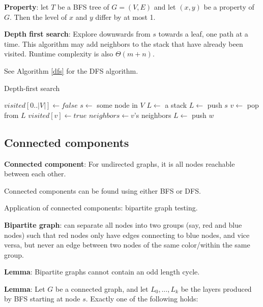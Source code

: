 \documentclass{article}
\begin{document}
\textbf{Property}: let $T$ be a BFS tree of $G = (V, E)$ and let $(x, y)$ be a property of $G$. Then the level of $x$ and $y$ differ by at most 1.

\textbf{Depth first search}: Explore downwards from $s$ towards a leaf, one path at a time. This algorithm may add neighbors to the stack that have already been visited. Runtime complexity is also $\Theta(m + n)$.

See Algorithm \ref{dfs} for the DFS algorithm.

\begin{algorithm}
\caption{Depth-first search}\label{dfs}
\begin{algorithmic}[1]
    \State $visited[0..|V|] \gets false$ 
    \State $s \gets$ some node in $V$ 
    \State $L \gets$ a stack 
    \State $L \gets$ push $s$
        \State $v \gets$ pop from $L$
            \State $visited[v] \gets true$
            \State $neighbors \gets v$'s neighbors
                \State $L \gets$ push $w$
            \EndFor
        \EndIf
    \EndWhile
\EndProcedure
\end{algorithmic}
\end{algorithm}

\subsection{Connected components}

\textbf{Connected component}: For undirected graphs, it is all nodes reachable between each other.

Connected components can be found using either BFS or DFS.

Application of connected components: bipartite graph testing.

\textbf{Bipartite graph}: can separate all nodes into two groups (say, red and blue nodes) such that red nodes only have edges connecting to blue nodes, and vice versa, but never an edge between two nodes of the same color/within the same group.

\textbf{Lemma}: Bipartite graphs cannot contain an odd length cycle.

\textbf{Lemma}: Let $G$ be a connected graph, and let $L_0, \dots, L_k$ be the layers produced by BFS starting at node $s$. Exactly one of the following holds:
\end{document}
